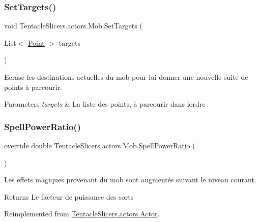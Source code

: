 \subsubsection{\texorpdfstring{Set\+Targets()}{SetTargets()}}
{\footnotesize\ttfamily void Tentacle\+Slicers.\+actors.\+Mob.\+Set\+Targets (\begin{DoxyParamCaption}\item[{List$<$ \hyperlink{class_tentacle_slicers_1_1general_1_1_point}{Point} $>$}]{targets }\end{DoxyParamCaption})}



Ecrase les destinations actuelles du mob pour lui donner une nouvelle suite de points à parcourir. 


\begin{DoxyParams}{Parameters}
{\em targets} & La liste des points, à parcourir dans l\textquotesingle{}ordre \\
\hline
\end{DoxyParams}
\mbox{\label{class_tentacle_slicers_1_1actors_1_1_mob_abdd7f17fd41371465d7f6b56bf91567c}} 
\subsubsection{\texorpdfstring{Spell\+Power\+Ratio()}{SpellPowerRatio()}}
{\footnotesize\ttfamily override double Tentacle\+Slicers.\+actors.\+Mob.\+Spell\+Power\+Ratio (\begin{DoxyParamCaption}{ }\end{DoxyParamCaption})\hspace{0.3cm}{\ttfamily [virtual]}}



Les effets magiques provenant du mob sont augmentés suivant le niveau courant. 

\begin{DoxyReturn}{Returns}
Le facteur de puissance des sorts 
\end{DoxyReturn}


Reimplemented from \hyperlink{class_tentacle_slicers_1_1actors_1_1_actor_a83e7b818449b5e92e3a7003c0cc6f571}{Tentacle\+Slicers.\+actors.\+Actor}.

